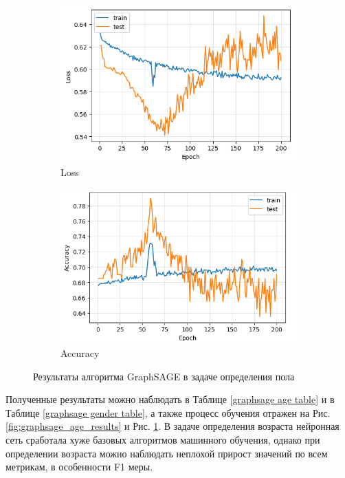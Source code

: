 \begin{figure}[h!]
\begin{subfigure}[h]{0.5\linewidth}
\includegraphics[width=\linewidth]{images/loss_gender}
\caption{Loss}
\end{subfigure}
\hfill
\begin{subfigure}[h]{0.5\linewidth}
\includegraphics[width=\linewidth]{images/acc_gender}
\caption{Accuracy}
\end{subfigure}%
\caption{Результаты алгоритма GraphSAGE в задаче определения пола}
\label{fig:graphsage_gender_results}
\end{figure}

Полученные результаты можно наблюдать в Таблице \ref{graphsage age table} и в Таблице \ref{graphsage gender table}, а также процесс обучения отражен на Рис. \ref{fig:graphsage_age_results} и Рис. \ref{fig:graphsage_gender_results}. В задаче определения возраста нейронная сеть сработала хуже базовых алгоритмов машинного обучения, однако при определении возраста можно наблюдать неплохой прирост значений по всем метрикам, в особенности F1 меры.


